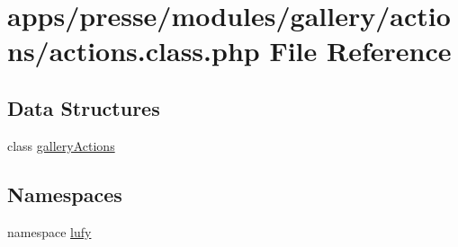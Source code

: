 \hypertarget{presse_2modules_2gallery_2actions_2actions_8class_8php}{\section{apps/presse/modules/gallery/actions/actions.class.\-php File Reference}
\label{presse_2modules_2gallery_2actions_2actions_8class_8php}
}
\subsection*{Data Structures}
\begin{DoxyCompactItemize}
\item 
class \hyperlink{classgallery_actions}{gallery\-Actions}
\end{DoxyCompactItemize}
\subsection*{Namespaces}
\begin{DoxyCompactItemize}
\item 
namespace \hyperlink{namespacelufy}{lufy}
\end{DoxyCompactItemize}
